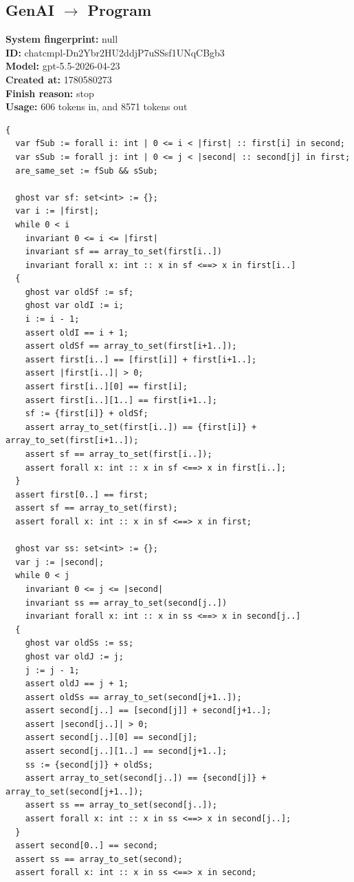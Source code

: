 \documentclass{article}
\begin{document}
\subsection*{GenAI $\rightarrow$ Program}
\textbf{System fingerprint: }null
\\\textbf{ID: }chatcmpl-Dn2Ybr2HU2ddjP7uSSsf1UNqCBgb3
\\\textbf{Model: }gpt-5.5-2026-04-23
\\\textbf{Created at: }1780580273
\\\textbf{Finish reason: }stop
\\\textbf{Usage: }606 tokens in, and 8571 tokens out
\begin{lstlisting}
{
  var fSub := forall i: int | 0 <= i < |first| :: first[i] in second;
  var sSub := forall j: int | 0 <= j < |second| :: second[j] in first;
  are_same_set := fSub && sSub;

  ghost var sf: set<int> := {};
  var i := |first|;
  while 0 < i
    invariant 0 <= i <= |first|
    invariant sf == array_to_set(first[i..])
    invariant forall x: int :: x in sf <==> x in first[i..]
  {
    ghost var oldSf := sf;
    ghost var oldI := i;
    i := i - 1;
    assert oldI == i + 1;
    assert oldSf == array_to_set(first[i+1..]);
    assert first[i..] == [first[i]] + first[i+1..];
    assert |first[i..]| > 0;
    assert first[i..][0] == first[i];
    assert first[i..][1..] == first[i+1..];
    sf := {first[i]} + oldSf;
    assert array_to_set(first[i..]) == {first[i]} + array_to_set(first[i+1..]);
    assert sf == array_to_set(first[i..]);
    assert forall x: int :: x in sf <==> x in first[i..];
  }
  assert first[0..] == first;
  assert sf == array_to_set(first);
  assert forall x: int :: x in sf <==> x in first;

  ghost var ss: set<int> := {};
  var j := |second|;
  while 0 < j
    invariant 0 <= j <= |second|
    invariant ss == array_to_set(second[j..])
    invariant forall x: int :: x in ss <==> x in second[j..]
  {
    ghost var oldSs := ss;
    ghost var oldJ := j;
    j := j - 1;
    assert oldJ == j + 1;
    assert oldSs == array_to_set(second[j+1..]);
    assert second[j..] == [second[j]] + second[j+1..];
    assert |second[j..]| > 0;
    assert second[j..][0] == second[j];
    assert second[j..][1..] == second[j+1..];
    ss := {second[j]} + oldSs;
    assert array_to_set(second[j..]) == {second[j]} + array_to_set(second[j+1..]);
    assert ss == array_to_set(second[j..]);
    assert forall x: int :: x in ss <==> x in second[j..];
  }
  assert second[0..] == second;
  assert ss == array_to_set(second);
  assert forall x: int :: x in ss <==> x in second;


\end{lstlisting}
\end{document}
